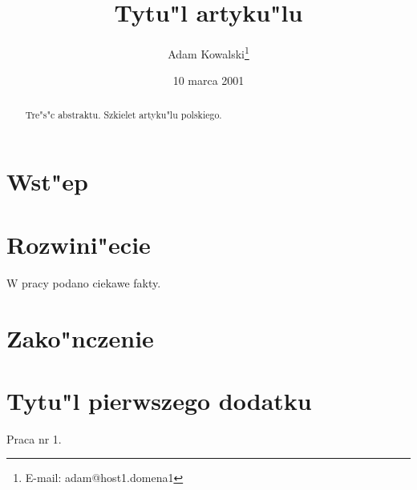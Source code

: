 \documentclass[12pt,a4paper]{article}
\title{Tytu"l artyku"lu}
\author{Adam Kowalski\thanks{E-mail: adam@host1.domena1}}
\date{10 marca 2001}
\begin{document}
\maketitle

\begin{abstract}
Tre"s"c abstraktu. 
Szkielet artyku"lu polskiego.
\end{abstract}


\section{Wst"ep}

\section{Rozwini"ecie}

W pracy \cite{label1} podano ciekawe fakty.

\section{Zako"nczenie}

\appendix

\section{Tytu"l pierwszego dodatku}

\begin{thebibliography}{99}

Praca nr 1.

\end{thebibliography}
\end{document}
